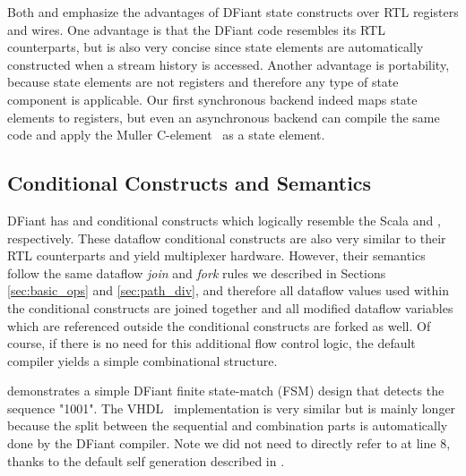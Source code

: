 Both  and  emphasize the advantages of DFiant state constructs over RTL registers and wires.
One advantage is that the DFiant code resembles its RTL counterparts, but is also very concise since state elements are automatically constructed when a stream history is accessed. Another advantage is portability, because state elements are not registers and therefore any type of state component is applicable. Our first synchronous backend indeed maps state elements to registers, but even an asynchronous backend can compile the same code and apply the Muller C-element~\cite{muller1957theory} as a state element. 

\subsection{Conditional Constructs and Semantics}
\label{sec:conditional}
DFiant has  and  conditional constructs which logically resemble the Scala  and , respectively. These dataflow conditional constructs are also very similar to their RTL counterparts and yield multiplexer hardware. However, their semantics follow the same dataflow \emph{join} and \emph{fork} rules we described in Sections \ref{sec:basic_ops} and \ref{sec:path_div}, and therefore all dataflow values used within the conditional constructs are joined together and all modified dataflow variables which are referenced outside the conditional constructs are forked as well. Of course, if there is no need for this additional flow control logic, the default compiler yields a simple combinational structure.

 demonstrates a simple DFiant finite state-match (FSM) design that detects the sequence "1001". The VHDL~\cite{seqdetvhdl} implementation is very similar but is mainly longer because the split between the sequential and combination parts is automatically done by the DFiant compiler.
Note we did not need to directly refer to  at line 8, thanks to the default self generation described in .

